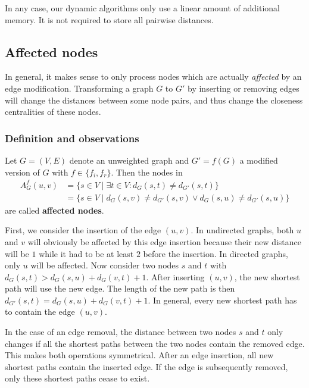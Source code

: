 In any case, our dynamic algorithms only use a linear amount of additional memory. It is not required to store all pairwise distances.


\subsection{Affected nodes}
In general, it makes sense to only process nodes which are actually \emph{affected} by an edge modification. Transforming a graph $G$ to $G'$ by inserting or removing edges will change the distances between some node pairs, and thus change the closeness centralities of these nodes.

\subsubsection{Definition and observations}

\begin{definition}
\label{def:affectedNodes}
	Let $G = (V, E)$ denote an unweighted graph and $G' = f(G)$ a modified version of $G$ with $f \in \{f_i, f_r\}$. Then the nodes in 
	\begin{align}
		A_G^f(u, v) &= \{s \in V \mid \exists t \in V : d_G(s,t) \neq d_{G'}(s, t)\} \label{eq:affectedNodesGeneral} \\
		            &=\{s \in V \mid d_G(s, v) \neq d_{G'}(s, v) \lor d_G(s, u) \neq d_{G'}(s, u)\} \label{eq:affectedNodesSimplified}
	\end{align} are called \textbf{affected nodes}.
\end{definition}
 
First, we consider the insertion of the edge $(u, v)$. In undirected graphs, both $u$ and $v$ will obviously be affected by this edge insertion because their new distance will be $1$ while it had to be at least $2$ before the insertion. In directed graphs, only $u$ will be affected. Now consider two nodes $s$ and $t$ with $d_G(s, t) > d_G(s, u) + d_G(v, t) + 1$. After inserting $(u, v)$, the new shortest path will use the new edge. The length of the new path is then $d_{G'}(s, t) = d_G(s, u) + d_G(v, t) + 1$. In general, every new shortest path has to contain the edge $(u, v)$.

In the case of an edge removal, the distance between two nodes $s$ and $t$ only changes if all the shortest paths between the two nodes contain the removed edge. This makes both operations symmetrical. After an edge insertion, all new shortest paths contain the inserted edge. If the edge is subsequently removed, only these shortest paths cease to exist.

